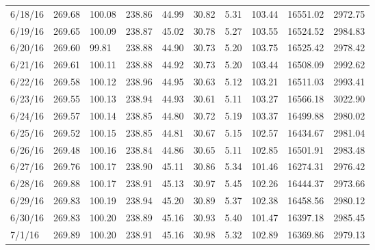 \documentclass[english]{article}
\begin{document}
\begin{appendices}
\begin{table}[H]
\begin{tabular}{@{}llllllllll@{}}
6/18/16       & 269.68       & 100.08       & 238.86      & 44.99           & 30.82        & 5.31         & 103.44       & 16551.02     & 2972.75      \\
6/19/16       & 269.65       & 100.09       & 238.87      & 45.02           & 30.78        & 5.27         & 103.55       & 16524.52     & 2984.83      \\
6/20/16       & 269.60       & 99.81        & 238.88      & 44.90           & 30.73        & 5.20         & 103.75       & 16525.42     & 2978.42      \\
6/21/16       & 269.61       & 100.11       & 238.88      & 44.92           & 30.73        & 5.20         & 103.44       & 16508.09     & 2992.62      \\
6/22/16       & 269.58       & 100.12       & 238.96      & 44.95           & 30.63        & 5.12         & 103.21       & 16511.03     & 2993.41      \\
6/23/16       & 269.55       & 100.13       & 238.94      & 44.93           & 30.61        & 5.11         & 103.27       & 16566.18     & 3022.90      \\
6/24/16       & 269.57       & 100.14       & 238.85      & 44.80           & 30.72        & 5.19         & 103.37       & 16499.88     & 2980.02      \\
6/25/16       & 269.52       & 100.15       & 238.85      & 44.81           & 30.67        & 5.15         & 102.57       & 16434.67     & 2981.04      \\
6/26/16       & 269.48       & 100.16       & 238.84      & 44.86           & 30.65        & 5.11         & 102.85       & 16501.91     & 2983.48      \\
6/27/16       & 269.76       & 100.17       & 238.90      & 45.11           & 30.86        & 5.34         & 101.46       & 16274.31     & 2976.42      \\
6/28/16       & 269.88       & 100.17       & 238.91      & 45.13           & 30.97        & 5.45         & 102.26       & 16444.37     & 2973.66      \\
6/29/16       & 269.83       & 100.19       & 238.94      & 45.20           & 30.89        & 5.37         & 102.38       & 16458.56     & 2980.12      \\
6/30/16       & 269.83       & 100.20       & 238.89      & 45.16           & 30.93        & 5.40         & 101.47       & 16397.18     & 2985.45      \\
7/1/16        & 269.89       & 100.20       & 238.91      & 45.16           & 30.98        & 5.32         & 102.89       & 16369.86     & 2979.13      \\

\end{tabular}
\end{table}
\end{appendices}
\end{document}

